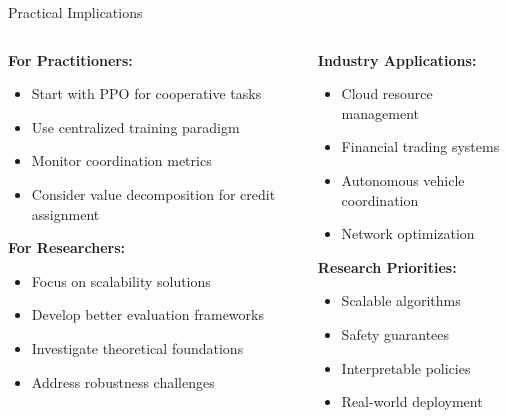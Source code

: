 \documentclass[aspectratio=169]{beamer}
\begin{document}
\begin{frame}{Practical Implications}
    
    \begin{columns}
        \begin{column}{0.5\textwidth}
            \textbf{For Practitioners:}
            \begin{itemize}
                \item Start with PPO for cooperative tasks
                \item Use centralized training paradigm
                \item Monitor coordination metrics
                \item Consider value decomposition for credit assignment
            \end{itemize}
            
            \vfill
            \textbf{For Researchers:}
            \begin{itemize}
                \item Focus on scalability solutions
                \item Develop better evaluation frameworks
                \item Investigate theoretical foundations
                \item Address robustness challenges
            \end{itemize}
        \end{column}
        \begin{column}{0.5\textwidth}
            \textbf{Industry Applications:}
            \begin{itemize}
                \item Cloud resource management
                \item Financial trading systems
                \item Autonomous vehicle coordination
                \item Network optimization
            \end{itemize}
            
            \vfill
            \textbf{Research Priorities:}
            \begin{itemize}
                \item Scalable algorithms
                \item Safety guarantees
                \item Interpretable policies
                \item Real-world deployment
            \end{itemize}
        \end{column}
    \end{columns}
\end{frame}
\end{document}
